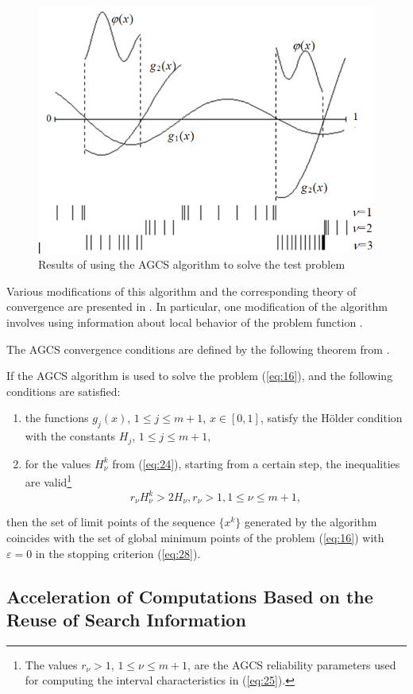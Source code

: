 \documentclass[smallextended]{svjour3}       %
\begin{document}
\begin{figure}
  \centering
  \includegraphics[width=0.6\linewidth]{fig2}
  \caption{Results of using the AGCS algorithm to solve the test problem}
  \label{fig:2}
\end{figure}

Various modifications of this algorithm and the corresponding theory of convergence are presented in \cite{c18}.
In particular, one modification of the algorithm involves using information about local behavior of the problem function  \cite{Sergeyev2003}.

The AGCS convergence conditions are defined by the following theorem from  \cite{c18}.

\begin{theorem}
If the AGCS algorithm is used to solve the problem (\ref{eq:16}), and the following conditions are satisfied:
\begin{enumerate}
	\item the functions $g_j(x)$, $1 \leq j \leq m+1$, $x\in[0,1]$, satisfy the H\"older condition with the constants $H_j$, $1 \leq j \leq m+1$,
	\item for the values $H^k_\nu$ from (\ref{eq:24}), starting from a certain step, the inequalities are valid\footnote{The values $r_{\nu} > 1$, $1 \leq \nu \leq m+1$, are the AGCS reliability parameters used for computing the interval characteristics in (\ref{eq:25}).}
\begin{equation} \label{eq:29}
r_\nu H^k_\nu > 2H_\nu, r_\nu > 1, 1 \leq \nu \leq m+1,
\end{equation}
\end{enumerate}
then the set of limit points of the sequence $\{x^k\}$ generated by the algorithm coincides with the set of global minimum points of the problem (\ref{eq:16}) with $\varepsilon=0$ in the stopping criterion (\ref{eq:28}).
\end{theorem}

\subsection{Acceleration of Computations Based on the Reuse of Search Information}
\end{document}
